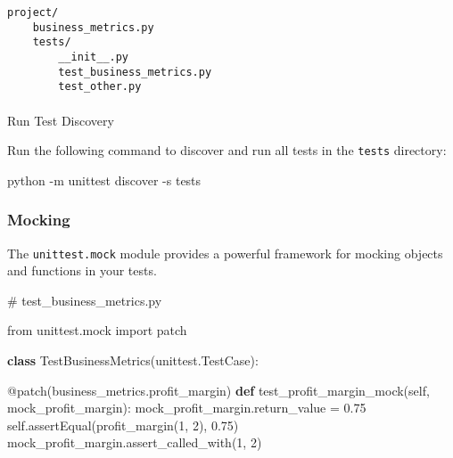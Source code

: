 \documentclass[
  letterpaper,
  DIV=11,
  numbers=noendperiod]{scrreprt}
\makeatletter
\let\oldparagraph\paragraph
\renewcommand{\paragraph}{
    \@ifstar
      \xxxParagraphStar
      \xxxParagraphNoStar
  }
\newcommand{\xxxParagraphStar}[1]{\oldparagraph*{#1}\mbox{}}
\newcommand{\xxxParagraphNoStar}[1]{\oldparagraph{#1}\mbox{}}
\newenvironment{Shaded}{\begin{snugshade}}{\end{snugshade}}
\newcommand{\AttributeTok}[1]{\textcolor[rgb]{0.40,0.45,0.13}{#1}}
\newcommand{\CommentTok}[1]{\textcolor[rgb]{0.37,0.37,0.37}{#1}}
\newcommand{\DecValTok}[1]{\textcolor[rgb]{0.68,0.00,0.00}{#1}}
\newcommand{\ExtensionTok}[1]{\textcolor[rgb]{0.00,0.23,0.31}{#1}}
\newcommand{\FloatTok}[1]{\textcolor[rgb]{0.68,0.00,0.00}{#1}}
\newcommand{\ImportTok}[1]{\textcolor[rgb]{0.00,0.46,0.62}{#1}}
\newcommand{\KeywordTok}[1]{\textcolor[rgb]{0.00,0.23,0.31}{\textbf{#1}}}
\newcommand{\NormalTok}[1]{\textcolor[rgb]{0.00,0.23,0.31}{#1}}
\newcommand{\OperatorTok}[1]{\textcolor[rgb]{0.37,0.37,0.37}{#1}}
\newcommand{\StringTok}[1]{\textcolor[rgb]{0.13,0.47,0.30}{#1}}
\newcommand{\VariableTok}[1]{\textcolor[rgb]{0.07,0.07,0.07}{#1}}
\makeatother
\begin{document}
\begin{verbatim}
project/
    business_metrics.py
    tests/
        __init__.py
        test_business_metrics.py
        test_other.py
\end{verbatim}

\paragraph{Run Test Discovery}\label{run-test-discovery}

Run the following command to discover and run all tests in the
\texttt{tests} directory:

\begin{Shaded}
\begin{Highlighting}[]
\ExtensionTok{python} \AttributeTok{{-}m}\NormalTok{ unittest discover }\AttributeTok{{-}s}\NormalTok{ tests}
\end{Highlighting}
\end{Shaded}

\subsubsection{Mocking}\label{mocking}

The \texttt{unittest.mock} module provides a powerful framework for
mocking objects and functions in your tests.

\begin{Shaded}
\begin{Highlighting}[]
\CommentTok{\# test\_business\_metrics.py}

\ImportTok{from}\NormalTok{ unittest.mock }\ImportTok{import}\NormalTok{ patch}

\KeywordTok{class}\NormalTok{ TestBusinessMetrics(unittest.TestCase):}

    \AttributeTok{@patch}\NormalTok{(}\StringTok{\textquotesingle{}business\_metrics.profit\_margin\textquotesingle{}}\NormalTok{)}
    \KeywordTok{def}\NormalTok{ test\_profit\_margin\_mock(}\VariableTok{self}\NormalTok{, mock\_profit\_margin):}
\NormalTok{        mock\_profit\_margin.return\_value }\OperatorTok{=} \FloatTok{0.75}
        \VariableTok{self}\NormalTok{.assertEqual(profit\_margin(}\DecValTok{1}\NormalTok{, }\DecValTok{2}\NormalTok{), }\FloatTok{0.75}\NormalTok{)}
\NormalTok{        mock\_profit\_margin.assert\_called\_with(}\DecValTok{1}\NormalTok{, }\DecValTok{2}\NormalTok{)}
\end{Highlighting}
\end{Shaded}
\end{document}
